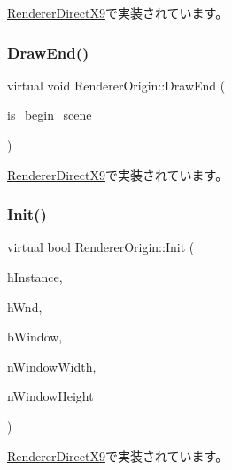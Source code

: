 \mbox{\hyperlink{class_renderer_direct_x9_a61fc7dc142c3d54f83152fc3bb259ff4}{Renderer\+Direct\+X9}}で実装されています。

\mbox{\label{class_renderer_origin_aa9a839fc8b7704a34ed62b1f3f8f3596}} 
\subsubsection{\texorpdfstring{Draw\+End()}{DrawEnd()}}
{\footnotesize\ttfamily virtual void Renderer\+Origin\+::\+Draw\+End (\begin{DoxyParamCaption}\item[{bool}]{is\+\_\+begin\+\_\+scene }\end{DoxyParamCaption})\hspace{0.3cm}{\ttfamily [pure virtual]}}



\mbox{\hyperlink{class_renderer_direct_x9_a8a29b6e70fa8b2f55a12c11143184ce1}{Renderer\+Direct\+X9}}で実装されています。

\mbox{\label{class_renderer_origin_aa143bcff2fb88499f58ed11729b94818}} 
\subsubsection{\texorpdfstring{Init()}{Init()}}
{\footnotesize\ttfamily virtual bool Renderer\+Origin\+::\+Init (\begin{DoxyParamCaption}\item[{H\+I\+N\+S\+T\+A\+N\+CE}]{h\+Instance,  }\item[{H\+W\+ND}]{h\+Wnd,  }\item[{B\+O\+OL}]{b\+Window,  }\item[{int}]{n\+Window\+Width,  }\item[{int}]{n\+Window\+Height }\end{DoxyParamCaption})\hspace{0.3cm}{\ttfamily [pure virtual]}}



\mbox{\hyperlink{class_renderer_direct_x9_ac40b12dece546ff9c9fd3155cea4c63b}{Renderer\+Direct\+X9}}で実装されています。

